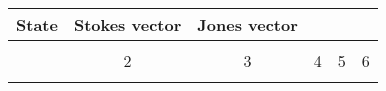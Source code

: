 \documentclass{article}
\begin{document}
    \begin{tabular}{c c c c c c}
        \toprule
        State & Stokes vector & Jones vector \\ 
        \midrule\\
        \addlinespace[-2ex]
        1 & 2 & 3 & 4 & 5 & 6  \\
        \addlinespace[1.5ex]
        \bottomrule
    \end{tabular}
\end{document}
